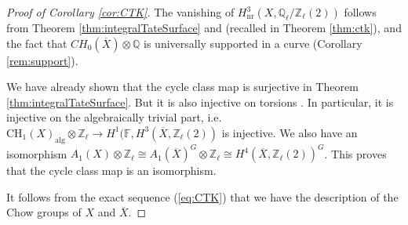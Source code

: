 \documentclass{amsart}
\theoremstyle{definition}
\theoremstyle{remark}
\newcommand{\mbb}{\mathbb}
\newcommand{\FF}{\mbb{F}}
\newcommand{\QQ}{\mbb{Q}}
\newcommand{\ZZ}{\mbb{Z}}
\begin{document}
\begin{proof}[Proof of Corollary \ref{cor:CTK}]
The vanishing of $H^3_{\text{nr}}(X, \QQ_\ell/\ZZ_\ell(2))$ follows from Theorem \ref{thm:integralTateSurface} and \cite[Th\'eor\`eme 2.2, Proposition 3.2]{CTKahnCycleCodim2} (recalled in Theorem \ref{thm:ctk}), and the fact that $CH_0(\overline{X})\otimes \QQ$ is universally supported in a curve (Corollary \ref{rem:support}).

We have already shown that the cycle class map is surjective in Theorem \ref{thm:integralTateSurface}. But it is also injective on torsions \cite[Th\'eor\`eme 4]{CT_Sansuc_Soule_torsion}. In particular, it is injective on the algebraically trivial part, i.e. $\text{CH}_1(X)_{\text{alg}} \otimes \ZZ_\ell \to H^1(\FF, H^3(\overline{X}, \ZZ_\ell(2))$ is injective. We also have an isomorphism $A_1(X) \otimes \ZZ_\ell \cong A_1(\overline{X})^G\otimes \ZZ_\ell \cong H^4(\overline{X}, \ZZ_\ell(2))^G$. This proves that the cycle class map is an isomorphism.

It follows from the exact sequence (\ref{eq:CTK}) that we have the description of the Chow groups of $X$ and $\overline{X}$.
\end{proof}




\end{document}
